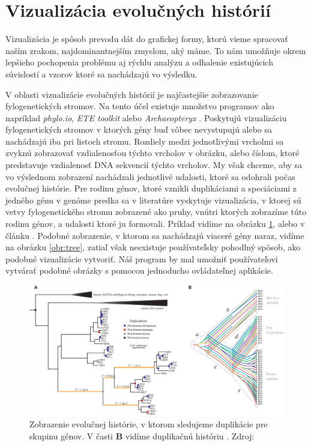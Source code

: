 \section{Vizualizácia evolučných histórií}
Vizualizácia je spôsob prevodu dát do grafickej formy, ktorú vieme spracovať naším zrakom, najdominantnejším zmyslom, aký máme.
To nám umožňuje okrem lepšieho pochopenia problému aj rýchlu analýzu a odhalenie existujúcich súvislostí a vzorov ktoré sa nachádzajú vo výsledku.

V oblasti  vizualizácie evolučných histórií je najčastejšie zobrazovanie fylogenetických stromov.
Na tento účel existuje množstvo programov  ako napríklad \emph{phylo.io}, \emph{ETE toolkit} alebo \emph{Archaeopteryx} \cite{Robinson_2016,Huerta-Cepas2010,archa}.
Poskytujú vizualizáciu fylogenetických stromov v ktorých gény buď vôbec nevystupujú alebo sa nachádzajú iba pri listoch stromu.
Rozdiely medzi jednotlivými vrcholmi sa zvyknú zobrazovať vzdialenosťou týchto vrcholov v obrázku, alebo číslom, ktoré predstavuje vzdialenosť DNA sekvencií týchto vrcholov. 
My však chceme, aby sa vo výslednom zobrazení nachádzali jednotlivé udalosti, ktoré sa odohrali počas evolučnej histórie.
Pre rodinu génov, ktoré vznikli duplikáciami a speciáciami z jedného génu v genóme predka sa v literatúre vyskytuje vizualizácia, v ktorej sú vetvy
fylogenetického stromu zobrazené ako pruhy, vnútri ktorých zobrazíme túto rodinu génov, a udalosti ktoré ju formovali. Príklad vidíme na obrázku 
\ref{obr:genetree},
alebo v článku \cite{gorecki2011maximum}. Podobné zobrazenie, v ktorom sa nachádzajú viaceré gény naraz, vidíme na obrázku \ref{obr:tree}, 
zatiaľ však neexistuje používateľsky pohodlný spôsob, ako podobné vizualizácie vytvoriť.
Náš program by mal umožniť používateľovi vytvárať podobné obrázky s pomocou jednoducho ovládateľnej aplikácie.
\begin{figure}[t]
 \centering
\includegraphics[width=1\textwidth]{images/genetree}
\caption{Zobrazenie evolučnej histórie, v ktorom sledujeme duplikácie pre skupinu génov. V časti \textbf{B} vidíme duplikačnú históriu . Zdroj: \cite{222}}\label{obr:genetree}
\end{figure}

